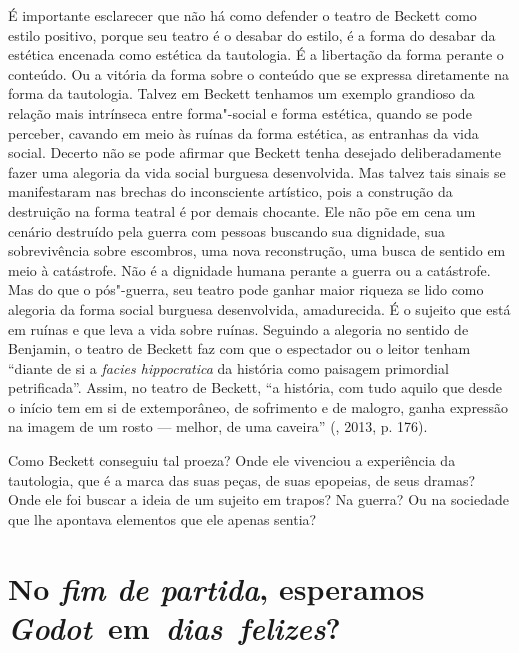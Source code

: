É importante esclarecer que não há como defender o teatro de Beckett
como estilo positivo, porque seu teatro é o desabar do estilo, é a forma
do desabar da estética encenada como estética da tautologia. É a
libertação da forma perante o conteúdo. Ou a vitória da forma sobre o
conteúdo que se expressa diretamente na forma da tautologia. Talvez em
Beckett tenhamos um exemplo grandioso da relação mais intrínseca entre
forma"-social e forma estética, quando se pode perceber, cavando em meio
às ruínas da forma estética, as entranhas da vida social. Decerto não se
pode afirmar que Beckett tenha desejado deliberadamente fazer uma
alegoria da vida social burguesa desenvolvida. Mas talvez tais sinais se
manifestaram nas brechas do inconsciente artístico, pois a construção da
destruição na forma teatral é por demais chocante. Ele não põe em cena
um cenário destruído pela guerra com pessoas buscando sua dignidade, sua
sobrevivência sobre escombros, uma nova reconstrução, uma busca de
sentido em meio à catástrofe. Não é a dignidade humana perante a guerra
ou a catástrofe. Mas do que o pós"-guerra, seu teatro pode ganhar maior
riqueza se lido como alegoria da forma social burguesa desenvolvida,
amadurecida. É o sujeito que está em ruínas e que leva a vida sobre
ruínas. Seguindo a alegoria no sentido de Benjamin, o teatro de Beckett
faz com que o espectador ou o leitor tenham ``diante de si a
\emph{facies hippocratica} da história como paisagem primordial
petrificada''. Assim, no teatro de Beckett, ``a história, com tudo
aquilo que desde o início tem em si de extemporâneo, de sofrimento e de
malogro, ganha expressão na imagem de um rosto --- melhor, de uma
caveira'' (, 2013, p. 176).

Como Beckett conseguiu tal proeza? Onde ele vivenciou a experiência da
tautologia, que é a marca das suas peças, de suas epopeias, de seus
dramas? Onde ele foi buscar a ideia de um sujeito em trapos? Na guerra?
Ou na sociedade que lhe apontava elementos que ele apenas sentia?


\section*{No \emph{fim de partida}, esperamos \emph{Godot}~em~\emph{dias~felizes}?}


